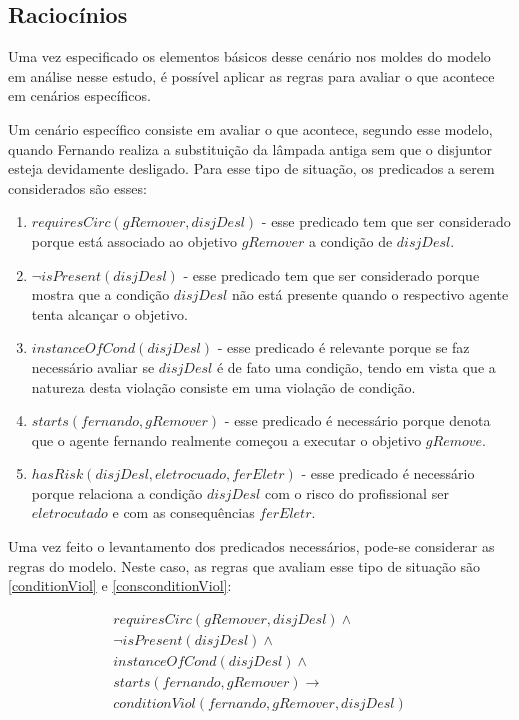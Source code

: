 \subsection{Raciocínios}

Uma vez especificado os elementos básicos desse cenário nos moldes do modelo em análise nesse estudo, é possível aplicar as regras para avaliar o que acontece em cenários específicos. 

Um cenário específico consiste em avaliar o que acontece, segundo esse modelo, quando Fernando realiza a substituição da lâmpada antiga sem que o disjuntor esteja devidamente desligado. Para esse tipo de situação, os predicados a serem considerados são esses:

\begin{enumerate}
	\item $requiresCirc(gRemover,disjDesl)$ - esse predicado tem que ser considerado porque está associado ao objetivo $gRemover$ a condição de $disjDesl$.
	\item $\neg isPresent(disjDesl)$ - esse predicado tem que ser considerado porque mostra que a condição $disjDesl$ não está presente quando o respectivo agente tenta alcançar o objetivo.
	\item $instanceOfCond(disjDesl)$ - esse predicado é relevante porque se faz necessário avaliar se $disjDesl$ é de fato uma condição, tendo em vista que a natureza desta violação consiste em uma violação de condição.
	\item $starts(fernando,gRemover)$ - esse predicado é necessário porque denota que o agente fernando realmente começou a executar o objetivo $gRemove$.
	\item $hasRisk(disjDesl, eletrocuado, ferEletr)$ - esse predicado é necessário porque relaciona a condição $disjDesl$ com o risco do profissional ser $eletrocutado$ e com as consequências $ferEletr$.
\end{enumerate}

Uma vez feito o levantamento dos predicados necessários, pode-se considerar as regras do modelo. Neste caso, as regras que avaliam esse tipo de situação são \ref{conditionViol} e \ref{consconditionViol}:

\begin{eqnarray}\label{applicationCodViolIntrodCase}\nonumber
	requiresCirc(gRemover,disjDesl) \wedge \\ \nonumber   
	\neg isPresent(disjDesl) \wedge  \\ \nonumber   
	instanceOfCond(disjDesl) \wedge \\ \nonumber   
	starts(fernando,gRemover)  \to \\ \nonumber   
	conditionViol(fernando,gRemover,disjDesl) \nonumber \\  
\end{eqnarray}

